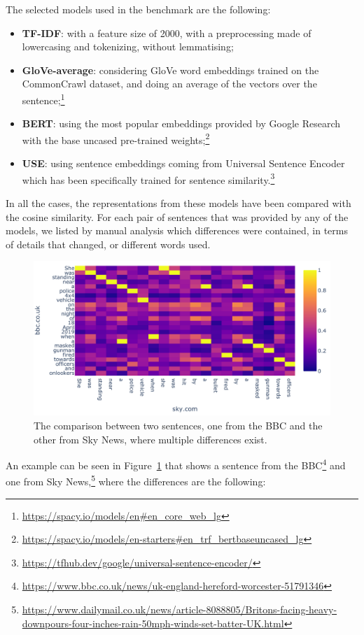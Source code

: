 The selected models used in the benchmark are the following:
\begin{itemize}
    \item \textbf{TF-IDF}: with a feature size of 2000, with a preprocessing made of lowercasing and tokenizing, without lemmatising;
    \item \textbf{GloVe-average}: considering GloVe word embeddings trained on the CommonCrawl dataset, and doing an average of the vectors over the sentence;\footnote{\url{https://spacy.io/models/en\#en_core_web_lg}}
    \item \textbf{BERT}: using the most popular embeddings provided by Google Research~\citep{devlin2018bert} with the base uncased pre-trained weights;\footnote{\url{https://spacy.io/models/en-starters\#en_trf_bertbaseuncased_lg}}
    \item \textbf{USE}: using sentence embeddings coming from Universal Sentence Encoder~\citep{cer2018universal} which has been specifically trained for sentence similarity.\footnote{\url{https://tfhub.dev/google/universal-sentence-encoder/}}
\end{itemize}

In all the cases, the representations from these models have been compared with the cosine similarity.
For each pair of sentences that was provided by any of the models, we listed by manual analysis which differences were contained, in terms of details that changed, or different words used.


\begin{figure}[!htb]
    \centering
    \includegraphics[width=0.9\linewidth]{figures/lyra.pdf}
    \caption{The comparison between two sentences, one from the BBC and the other from Sky News, where multiple differences exist.}
    \label{fig:lyra}
\end{figure}

An example can be seen in Figure~\ref{fig:lyra} that shows a sentence from the BBC\footnote{\url{https://www.bbc.co.uk/news/uk-england-hereford-worcester-51791346}} and one from Sky News,\footnote{\url{https://www.dailymail.co.uk/news/article-8088805/Britons-facing-heavy-downpours-four-inches-rain-50mph-winds-set-batter-UK.html}} where the differences are the following:

